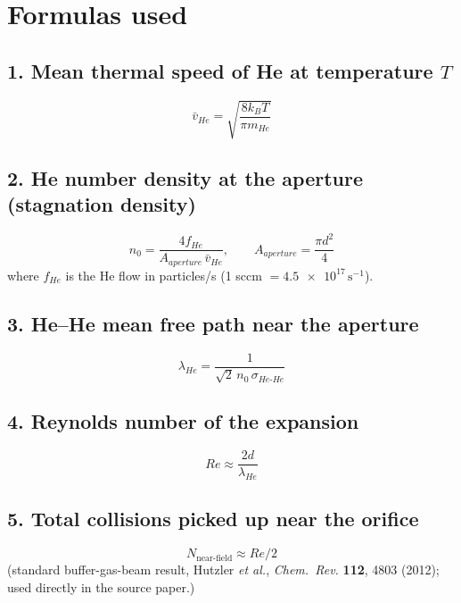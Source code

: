 \documentclass[11pt]{article}
\begin{document}
\section*{Formulas used}

\subsection*{1. Mean thermal speed of He at temperature $T$}
\begin{equation}
\bar{v}_{He} = \sqrt{\dfrac{8 k_B T}{\pi m_{He}}}
\end{equation}

\subsection*{2. He number density at the aperture (stagnation density)}
\begin{equation}
n_0 = \dfrac{4 f_{He}}{A_{aperture}\, \bar{v}_{He}}, \qquad
A_{aperture} = \dfrac{\pi d^2}{4}
\end{equation}
where $f_{He}$ is the He flow in particles/s (1 sccm $= \num{4.5e17}\,\text{s}^{-1}$).

\subsection*{3. He--He mean free path near the aperture}
\begin{equation}
\lambda_{He} = \dfrac{1}{\sqrt{2}\, n_0\, \sigma_{He\text{-}He}}
\end{equation}

\subsection*{4. Reynolds number of the expansion}
\begin{equation}
Re \approx \dfrac{2 d}{\lambda_{He}}
\end{equation}

\subsection*{5. Total collisions picked up near the orifice}
\begin{equation}
N_{\text{near-field}} \approx Re/2
\end{equation}
(standard buffer-gas-beam result, Hutzler \textit{et al.}, \textit{Chem.\ Rev.} \textbf{112}, 4803 (2012);
used directly in the source paper.)
\end{document}
